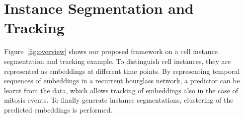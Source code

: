 \documentclass[runningheads,a4paper]{llncs}
\begin{document}






\section{Instance Segmentation and Tracking}
\label{sec:instance_tracking}


Figure~\ref{fig:overview} shows our proposed framework on a cell instance segmentation and tracking example.
To distinguish cell instances, they are represented as embeddings at different time points.
By representing temporal sequences of embeddings in a recurrent hourglass network, a predictor can be learnt from the data, which allows tracking of embeddings also in the case of mitosis events.
To finally generate instance segmentations, clustering of the predicted embeddings is performed.


\end{document}
